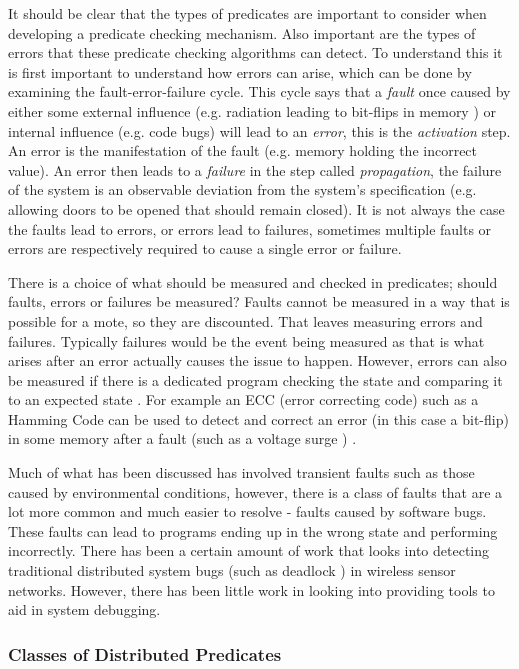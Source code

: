 It should be clear that the types of predicates are important to consider when developing a predicate checking mechanism. Also important are the types of errors that these predicate checking algorithms can detect. To understand this it is first important to understand how errors can arise, which can be done by examining the fault-error-failure cycle. This cycle says that a \emph{fault} once caused by either some external influence (e.g. radiation leading to bit-flips in memory \cite{1017791}) or internal influence (e.g. code bugs) will lead to an \emph{error}, this is the \emph{activation} step. An error is the manifestation of the fault (e.g. memory holding the incorrect value). An error then leads to a \emph{failure} in the step called \emph{propagation}, the failure of the system is an observable deviation from the system's specification (e.g. allowing doors to be opened that should remain closed). It is not always the case the faults lead to errors, or errors lead to failures, sometimes multiple faults or errors are respectively required to cause a single error or failure. \cite{1335465}

There is a choice of what should be measured and checked in predicates; should faults, errors or failures be measured? Faults cannot be measured \cite{?} in a way that is possible for a mote, so they are discounted. That leaves measuring errors and failures. Typically failures would be the event being measured \cite{?} as that is what arises after an error actually causes the issue to happen. However, errors can also be measured if there is a dedicated program checking the state and comparing it to an expected state \cite{?}. For example an ECC (error correcting code) such as a Hamming Code can be used to detect and correct an error (in this case a bit-flip) in some memory after a fault (such as a voltage surge ) \cite{hamming1950error}.

Much of what has been discussed has involved transient faults such as those caused by environmental conditions, however, there is a class of faults that are a lot more common and much easier to resolve - faults caused by software bugs. These faults can lead to programs ending up in the wrong state and performing incorrectly. There has been a certain amount of work that looks into detecting traditional distributed system bugs (such as deadlock \cite{5587352,5284172}) in wireless sensor networks. However, there has been little work in looking into providing tools to aid in system debugging.

\subsubsection{Classes of Distributed Predicates}

